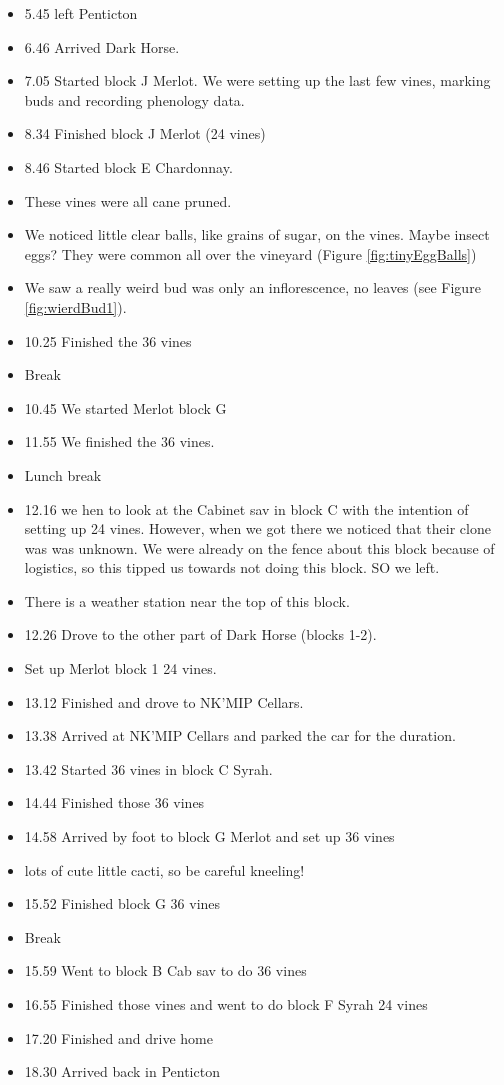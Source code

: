 \documentclass[11pt,letter]{article}
\newenvironment{smitemize}{
\begin{itemize}
  \setlength{\itemsep}{0pt}
  \setlength{\parskip}{0.8pt}
  \setlength{\parsep}{0pt}}
{\end{itemize}
}
\begin{document}
\begin{smitemize}
\item 5.45 left Penticton 
\item 6.46 Arrived Dark Horse.
\item 7.05 Started block J Merlot.  We were setting up the last few vines, marking buds and recording phenology data.
\item 8.34 Finished block J Merlot (24 vines)
\item 8.46 Started block E Chardonnay.
\item These vines were all cane pruned.
\item We noticed little clear balls, like grains of sugar, on the vines. Maybe insect eggs? They were common all over the vineyard (Figure \ref{fig:tinyEggBalls})
\item We saw a really weird bud was only an inflorescence, no leaves (see Figure \ref{fig:wierdBud1}).
\item 10.25 Finished the 36 vines
\item Break
\item 10.45 We started Merlot block G
\item 11.55 We finished the 36 vines.
\item Lunch break
\item 12.16 we hen to look at the Cabinet sav in block C with the intention of setting up 24 vines. However, when we got there we noticed that their clone was was unknown. We were already on the fence about this block because of logistics, so this tipped us towards not doing this block. SO we left. 
\item There is a weather station near the top of this block.
\item 12.26 Drove to the other part of Dark Horse (blocks 1-2).
\item Set up Merlot block 1 24 vines. 
\item 13.12 Finished and drove to NK'MIP Cellars.
\item 13.38 Arrived at NK'MIP Cellars and parked the car for the duration.
\item 13.42 Started 36 vines in block C Syrah.
\item 14.44 Finished those 36 vines
\item 14.58 Arrived by foot to block G Merlot and set up 36 vines 
\item lots of cute little cacti, so be careful kneeling!
\item 15.52 Finished block G 36 vines
\item Break
\item 15.59 Went to block B Cab sav to do 36 vines
\item 16.55 Finished those vines and went to do block F Syrah 24 vines
\item 17.20 Finished and drive home
\item 18.30 Arrived back in Penticton  

\end{smitemize}
\end{document}
